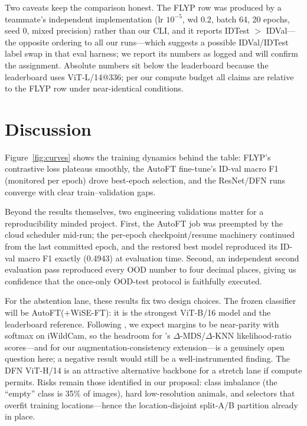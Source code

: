 \documentclass{article}
\begin{document}
Two caveats keep the comparison honest. The FLYP row was produced by a teammate's
independent implementation (lr $10^{-5}$, wd 0.2, batch 64, 20 epochs, seed 0, mixed
precision) rather than our CLI, and it reports IDTest $>$ IDVal---the opposite ordering
to all our runs---which suggests a possible IDVal/IDTest label swap in that eval harness;
we report its numbers as logged and will confirm the assignment. Absolute numbers sit
below the leaderboard because the leaderboard uses ViT-L/14@336; per our compute budget
all claims are relative to the FLYP row under near-identical conditions.

\section{Discussion}
Figure~\ref{fig:curves} shows the training dynamics behind the table: FLYP's contrastive
loss plateaus smoothly, the AutoFT fine-tune's ID-val macro F1 (monitored per epoch) drove
best-epoch selection, and the ResNet/DFN runs converge with clear train--validation gaps.

Beyond the results themselves, two engineering validations matter for a reproducibility
minded project. First, the AutoFT job was preempted by the cloud scheduler mid-run; the
per-epoch checkpoint/resume machinery continued from the last committed epoch, and the
restored best model reproduced its ID-val macro F1 exactly (0.4943) at evaluation time.
Second, an independent second evaluation pass reproduced every OOD number to four decimal
places, giving us confidence that the once-only OOD-test protocol is faithfully executed.

For the abstention lane, these results fix two design choices. The frozen classifier will
be AutoFT(+WiSE-FT): it is the strongest ViT-B/16 model and the leaderboard reference.
Following \citet{liang2024selectiveclassificationdistributionshifts}, we expect margins
to be near-parity with softmax on iWildCam, so the headroom for
\citet{heng2026know}'s $\Delta$-MDS/$\Delta$-KNN likelihood-ratio scores---and for our
augmentation-consistency extension---is a genuinely open question here; a negative result
would still be a well-instrumented finding. The DFN ViT-H/14 is an attractive alternative
backbone for a stretch lane if compute permits. Risks remain those identified in our
proposal: class imbalance (the ``empty'' class is 35\% of images), hard low-resolution
animals, and selectors that overfit training locations---hence the location-disjoint
split-A/B partition already in place.
\end{document}
